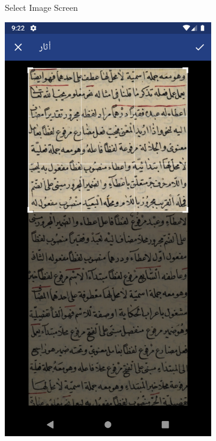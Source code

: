 \begin{figure}[H]
\begin{subfigure}[b]{0.3\textwidth}
         \caption{Select Image Screen}
         \label{fig:mobile-select-image}
     \end{subfigure}
      \begin{subfigure}[b]{0.3\textwidth}
         \centering
         \includegraphics[width=\textwidth]{images/app/mobile/mobile-4.png}

\end{subfigure}
\end{figure}
